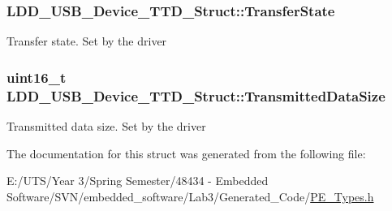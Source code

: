 \subsubsection[{Transfer\+State}]{ L\+D\+D\+\_\+\+U\+S\+B\+\_\+\+Device\+\_\+\+T\+T\+D\+\_\+\+Struct\+::\+Transfer\+State}\label{struct_l_d_d___u_s_b___device___t_t_d___struct_aca23e3743f56dc73206b79f885e9130f}
Transfer state. Set by the driver \hypertarget{struct_l_d_d___u_s_b___device___t_t_d___struct_aeffbf1300fce5fc9ebf98f5760a96d38}{}
\subsubsection[{Transmitted\+Data\+Size}]{\setlength{\rightskip}{0pt plus 5cm}uint16\+\_\+t L\+D\+D\+\_\+\+U\+S\+B\+\_\+\+Device\+\_\+\+T\+T\+D\+\_\+\+Struct\+::\+Transmitted\+Data\+Size}\label{struct_l_d_d___u_s_b___device___t_t_d___struct_aeffbf1300fce5fc9ebf98f5760a96d38}
Transmitted data size. Set by the driver 

The documentation for this struct was generated from the following file\+:\begin{DoxyCompactItemize}
\item 
E\+:/\+U\+T\+S/\+Year 3/\+Spring Semester/48434 -\/ Embedded Software/\+S\+V\+N/embedded\+\_\+software/\+Lab3/\+Generated\+\_\+\+Code/\hyperlink{_p_e___types_8h}{P\+E\+\_\+\+Types.\+h}\end{DoxyCompactItemize}
